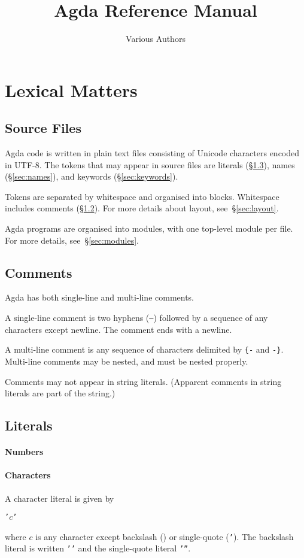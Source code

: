 \documentclass{article}
\begin{document}
\title{Agda Reference Manual}
\author{Various Authors}
\maketitle
\section{Lexical Matters}
\subsection{Source Files}
Agda code is written in plain text files consisting of Unicode characters encoded in UTF-8.
The tokens that may appear in source files are literals (\S\ref{sec:literals}), names (\S\ref{sec:names}), and keywords (\S\ref{sec:keywords}).

Tokens are separated by whitespace and organised into blocks.
Whitespace includes comments (\S\ref{sec:comments}).
For more details about layout, see~\S\ref{sec:layout}.

Agda programs are organised into modules, with one top-level module per file.
For more details, see~\S\ref{sec:modules}.
\subsection{Comments}
\label{sec:comments}
Agda has both single-line and multi-line comments.

A single-line comment is two hyphens (\texttt{--}) followed by a sequence of any characters except newline.
The comment ends with a newline.

A multi-line comment is any sequence of characters delimited by \texttt{\{-} and \texttt{-\}}.
Multi-line comments may be nested, and must be nested properly.

Comments may not appear in string literals.
(Apparent comments in string literals are part of the string.)
\subsection{Literals}
\label{sec:literals}
\paragraph{Numbers}
\paragraph{Characters}
A character literal is given by
\begin{alltt}
'\(c\)'
\end{alltt}
where $c$ is any character except backslash (\texttt{}) or single-quote (\texttt{'}).
The backslash literal is written \texttt{''} and the single-quote literal \texttt{'''}.
\end{document}

